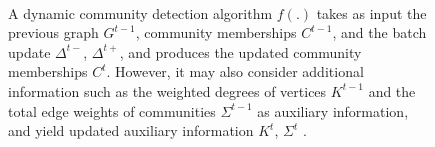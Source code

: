\begin{figure}[hbtp]
  \centering
   \\[-2ex]
  \caption{A dynamic community detection algorithm $f(.)$ takes as input the previous graph $G^{t-1}$, community memberships $C^{t-1}$, and the batch update $\Delta^{t-}$, $\Delta^{t+}$, and produces the updated community memberships $C^t$. However, it may also consider additional information such as the weighted degrees of vertices $K^{t-1}$ and the total edge weights of communities $\Sigma^{t-1}$ as auxiliary information, and yield updated auxiliary information $K^t$, $\Sigma^t$ \cite{sahu2024dflouvain}.}
  \label{fig:about-auxiliary}
\end{figure}
